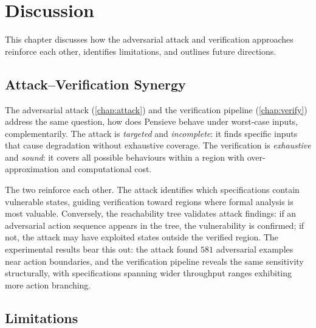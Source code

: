 \documentclass[thesis]{uofithesis} %
\begin{document}

\section{Discussion}
\label{chap:discussion}

    This chapter discusses how the adversarial attack and verification
    approaches reinforce each other, identifies limitations, and
    outlines future directions.


    \subsection{Attack--Verification Synergy}
    \label{sec:disc-synergy}

    The adversarial attack (\ref{chap:attack}) and the verification
    pipeline (\ref{chap:verify}) address the same question, how does
    Pensieve behave under worst-case inputs, complementarily.  
    The attack is \emph{targeted} and \emph{incomplete}: it
    finds specific inputs that cause degradation without exhaustive coverage.  
    The verification is \emph{exhaustive} and \emph{sound}: it covers all 
    possible behaviours within a region with over-approximation and computational cost.

    The two reinforce each other.  The attack identifies which
    specifications contain vulnerable states, guiding verification
    toward regions where formal analysis is most valuable.  Conversely,
    the reachability tree validates attack findings: if an adversarial
    action sequence appears in the tree, the vulnerability is
    confirmed; if not, the attack may have exploited states outside the
    verified region.  The experimental results bear this out: the
    attack found $581$ adversarial examples near action boundaries,
    and the verification pipeline reveals the same sensitivity
    structurally, with specifications spanning wider throughput ranges
    exhibiting more action branching.


    \subsection{Limitations}
    \label{sec:disc-limitations}
\end{document}
